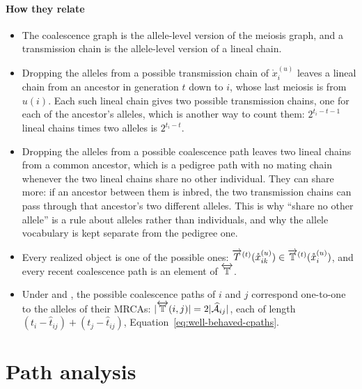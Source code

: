 \documentclass[12pt]{article}
\numberwithin{equation}{section}
\begin{document}
\paragraph{How they relate}
\begin{itemize}
    \item The coalescence graph is the allele-level version of the meiosis graph, and a transmission chain is the allele-level version of a lineal chain.
    \item Dropping the alleles from a possible transmission chain of $\mathring{x}_i^{(u)}$ leaves a lineal chain from an ancestor in generation $t$ down to $i$, whose last meiosis is from $u(i)$.
    Each such lineal chain gives two possible transmission chains, one for each of the ancestor's alleles, which is another way to count them: $2^{t_i - t - 1}$ lineal chains times two alleles is $2^{t_i - t}$.
    \item Dropping the alleles from a possible coalescence path leaves two lineal chains from a common ancestor, which is a pedigree path with no mating chain whenever the two lineal chains share no other individual.
    They can share more: if an ancestor between them is inbred, the two transmission chains can pass through that ancestor's two different alleles.
    This is why ``share no other allele'' is a rule about alleles rather than individuals, and why the allele vocabulary is kept separate from the pedigree one.
    \item Every realized object is one of the possible ones: $\overrightarrow{T}^{(t)}(\mathring{x}_{ik}^{(u)}) \in \overrightarrow{\mathbb{T}}^{(t)}(\mathring{x}_i^{(u)})$, and every recent coalescence path is an element of $\overleftrightarrow{\mathbb{T}}$.
    \item Under  and , the possible coalescence paths of $i$ and $j$ correspond one-to-one to the alleles of their MRCAs: $|\overleftrightarrow{\mathbb{T}}(i,j)| = 2|\widehat{\mathcal{A}}_{ij}|$, each of length $(t_i - \hat{t}_{ij}) + (t_j - \hat{t}_{ij})$, Equation~\eqref{eq:well-behaved-cpaths}.
\end{itemize}

\section{Path analysis}\label{app:path-analysis}
\end{document}
